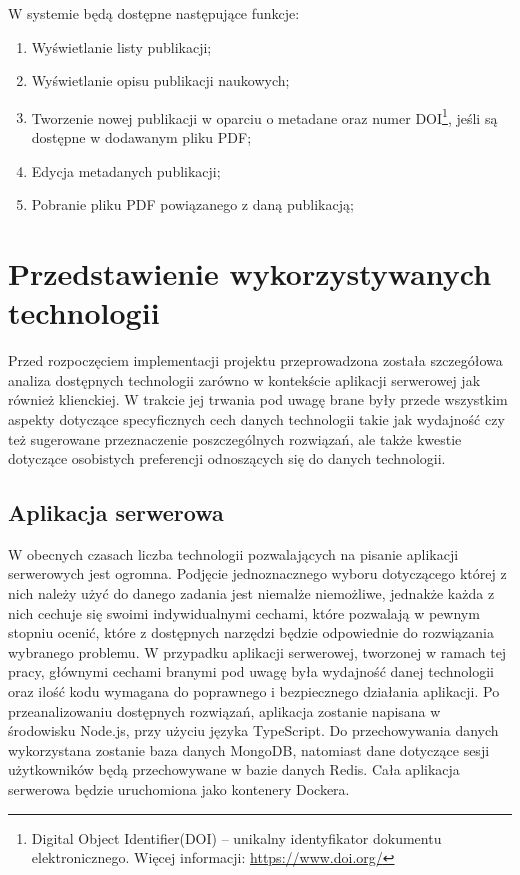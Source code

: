 \documentclass[a4paper,12pt,twoside,openany]{report}
\begin{document}
W systemie będą dostępne następujące funkcje:		
\begin{enumerate}
	\item Wyświetlanie listy publikacji;
	\item Wyświetlanie opisu publikacji naukowych;
	\item Tworzenie nowej publikacji w oparciu o metadane oraz numer DOI\footnote{Digital Object Identifier(DOI) -- unikalny identyfikator dokumentu elektronicznego. Więcej informacji: \url{https://www.doi.org/} }, jeśli są dostępne w dodawanym pliku PDF;
	\item Edycja metadanych publikacji;
	\item Pobranie pliku PDF powiązanego z daną publikacją;
\end{enumerate}
\chapter{Przedstawienie wykorzystywanych technologii}
Przed rozpoczęciem implementacji projektu przeprowadzona została szczegółowa analiza dostępnych technologii zarówno w kontekście aplikacji serwerowej jak również klienckiej. W trakcie jej trwania pod uwagę brane były przede wszystkim aspekty dotyczące specyficznych cech danych technologii takie jak wydajność czy też sugerowane przeznaczenie poszczególnych rozwiązań, ale także kwestie dotyczące osobistych preferencji odnoszących się do danych technologii.
\section{Aplikacja serwerowa}
W obecnych czasach liczba technologii pozwalających na pisanie aplikacji serwerowych jest ogromna. Podjęcie jednoznacznego wyboru dotyczącego której z nich należy użyć do danego zadania jest niemalże niemożliwe, jednakże każda z nich cechuje się swoimi indywidualnymi cechami, które pozwalają w pewnym stopniu ocenić, które z dostępnych narzędzi będzie odpowiednie do rozwiązania wybranego problemu. W przypadku aplikacji serwerowej, tworzonej w ramach tej pracy, głównymi cechami branymi pod uwagę była wydajność danej technologii oraz ilość kodu wymagana do poprawnego i bezpiecznego działania aplikacji. Po przeanalizowaniu dostępnych rozwiązań, aplikacja zostanie napisana w środowisku Node.js, przy użyciu języka TypeScript. Do przechowywania danych wykorzystana zostanie baza danych MongoDB, natomiast dane dotyczące sesji użytkowników będą przechowywane w bazie danych Redis. Cała aplikacja serwerowa będzie uruchomiona jako kontenery Dockera.
\end{document}
